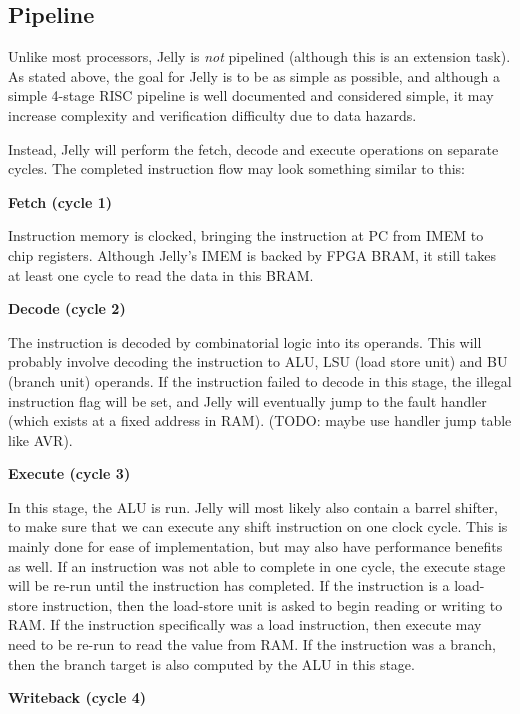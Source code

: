 \documentclass{article}
\begin{document}
\subsection{Pipeline}
Unlike most processors, Jelly is \textit{not} pipelined (although this is an extension task). As stated
above, the goal for Jelly is to be as simple as possible, and although a simple 4-stage RISC pipeline is well
documented and considered simple, it may increase complexity and verification difficulty due to data hazards.

Instead, Jelly will perform the fetch, decode and execute operations on separate cycles. The completed
instruction flow may look something similar to this:

\textbf{Fetch (cycle 1)}

Instruction memory is clocked, bringing the instruction at PC from IMEM to chip registers. Although
Jelly's IMEM is backed by FPGA BRAM, it still takes at least one cycle to read the data in this BRAM.

\textbf{Decode (cycle 2)}

The instruction is decoded by combinatorial logic into its operands. This will probably involve decoding the
instruction to ALU, LSU (load store unit) and BU (branch unit) operands. If the instruction failed to decode
in this stage, the illegal instruction flag will be set, and Jelly will eventually jump to the fault handler
(which exists at a fixed address in RAM). (TODO: maybe use handler jump table like AVR).

\textbf{Execute (cycle 3)}

In this stage, the ALU is run. Jelly will most likely also contain a barrel shifter, to make sure that we can
execute any shift instruction on one clock cycle. This is mainly done for ease of implementation, but may
also have performance benefits as well. If an instruction was not able to complete in one cycle, the execute
stage will be re-run until the instruction has completed. If the instruction is a load-store instruction,
then the load-store unit is asked to begin reading or writing to RAM. If the instruction specifically was a
load instruction, then execute may need to be re-run to read the value from RAM. If the instruction was a
branch, then the branch target is also computed by the ALU in this stage.


\textbf{Writeback (cycle 4)}
\end{document}
